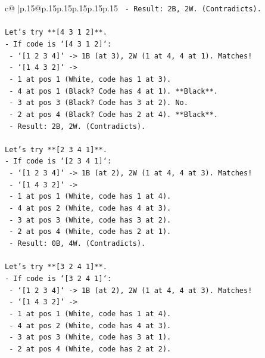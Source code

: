 \documentclass{article}
\begin{document}
{\begin{supertabular}{c@{$\;$}|p{.15\linewidth}@{}p{.15\linewidth}p{.15\linewidth}p{.15\linewidth}p{.15\linewidth}p{.15\linewidth}}
{{{\texttt{    {-} Result: 2B, 2W. (Contradicts).} \\
\\ 
\texttt{Let's try **{[}4 3 1 2{]}**.} \\
\texttt{{-} If code is `{[}4 3 1 2{]}`:} \\
\texttt{  {-} `{[}1 2 3 4{]}` {-}> 1B (at 3), 2W (1 at 4, 4 at 1). Matches!} \\
\texttt{  {-} `{[}1 4 3 2{]}` {-}>} \\
\texttt{    {-} 1 at pos 1 (White, code has 1 at 3).} \\
\texttt{    {-} 4 at pos 1 (Black? Code has 4 at 1). **Black**.} \\
\texttt{    {-} 3 at pos 3 (Black? Code has 3 at 2). No.} \\
\texttt{    {-} 2 at pos 4 (Black? Code has 2 at 4). **Black**.} \\
\texttt{    {-} Result: 2B, 2W. (Contradicts).} \\
\\ 
\texttt{Let's try **{[}2 3 4 1{]}**.} \\
\texttt{{-} If code is `{[}2 3 4 1{]}`:} \\
\texttt{  {-} `{[}1 2 3 4{]}` {-}> 1B (at 2), 2W (1 at 4, 4 at 3). Matches!} \\
\texttt{  {-} `{[}1 4 3 2{]}` {-}>} \\
\texttt{    {-} 1 at pos 1 (White, code has 1 at 4).} \\
\texttt{    {-} 4 at pos 2 (White, code has 4 at 3).} \\
\texttt{    {-} 3 at pos 3 (White, code has 3 at 2).} \\
\texttt{    {-} 2 at pos 4 (White, code has 2 at 1).} \\
\texttt{    {-} Result: 0B, 4W. (Contradicts).} \\
\\ 
\texttt{Let's try **{[}3 2 4 1{]}**.} \\
\texttt{{-} If code is `{[}3 2 4 1{]}`:} \\
\texttt{  {-} `{[}1 2 3 4{]}` {-}> 1B (at 2), 2W (1 at 4, 4 at 3). Matches!} \\
\texttt{  {-} `{[}1 4 3 2{]}` {-}>} \\
\texttt{    {-} 1 at pos 1 (White, code has 1 at 4).} \\
\texttt{    {-} 4 at pos 2 (White, code has 4 at 3).} \\
\texttt{    {-} 3 at pos 3 (White, code has 3 at 1).} \\
\texttt{    {-} 2 at pos 4 (White, code has 2 at 2).} \\
}}}
\end{supertabular}}
\end{document}
